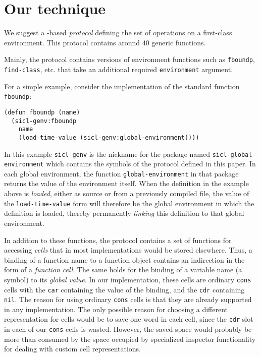 \section{Our technique}

We suggest a \clos{}-based \emph{protocol} defining the set of
operations on a first-class environment.  This protocol contains
around $40$ generic functions.

Mainly, the protocol contains versions of \commonlisp{} environment
functions such as \texttt{fboundp}, \texttt{find-class}, etc. that
take an additional required \texttt{environment} argument.

For a simple example, consider the \sicl{} implementation of the
standard \commonlisp{} function \texttt{fboundp}:

{\small\begin{verbatim}
(defun fboundp (name)
  (sicl-genv:fboundp
    name
    (load-time-value (sicl-genv:global-environment))))
\end{verbatim}}

In this example \texttt{sicl-genv} is the nickname for the package
named \texttt{sicl-global-environment} which contains the symbols of
the protocol defined in this paper.  In each global environment, the
function \texttt{global-environment} in that package returns
the value of the environment itself.  When the definition in the
example above is \emph{loaded}, either as source or from a previously
compiled file, the value of the \texttt{load-time-value} form will
therefore be the global environment in which the definition is loaded,
thereby permanently \emph{linking} this definition to that global
environment.

In addition to these functions, the protocol contains a set of
functions for accessing \emph{cells} that in most implementations
would be stored elsewhere.  Thus, a binding of a function name to a
function object contains an indirection in the form of a
\emph{function cell}.  The same holds for the binding of a variable
name (a symbol) to its \emph{global value}.  In our implementation,
these cells are ordinary \texttt{cons} cells with the \texttt{car}
containing the value of the binding, and the \texttt{cdr} containing
\texttt{nil}.  The reason for using ordinary \texttt{cons} cells is
that they are already supported in any \commonlisp{} implementation.
The only possible reason for choosing a different representation for
cells would be to save one word in each cell, since the \texttt{cdr}
slot in each of our \texttt{cons} cells is wasted.  However, the saved
space would probably be more than consumed by the space occupied by
specialized inspector functionality for dealing with custom cell
representations.

